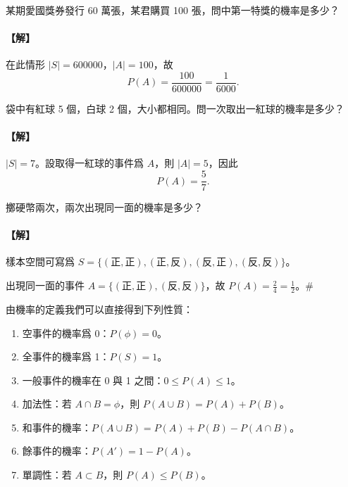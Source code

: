 \medskip
\begin{example}\label{ex:b5s-3-2}
某期愛國獎券發行 60 萬張，某君購買 100 張，問中第一特獎的機率是多少？
\end{example}
\paragraph{【解】}
在此情形 $|S|=600000$，$|A|=100$，故
\[
P(A) = \frac{100}{600000} = \frac{1}{6000}.
\]

\medskip
\begin{example}\label{ex:b5s-3-3}
袋中有紅球 5 個，白球 2 個，大小都相同。問一次取出一紅球的機率是多少？
\end{example}
\paragraph{【解】}
$|S|=7$。設取得一紅球的事件爲 $A$，則 $|A|=5$，因此
\[
P(A) = \frac{5}{7}. \tag*{\#}
\]

\medskip
\begin{example}\label{ex:b5s-3-4}
擲硬幣兩次，兩次出現同一面的機率是多少？
\end{example}
\paragraph{【解】}
樣本空間可寫爲 $S=\{(\text{正}, \text{正}), (\text{正}, \text{反}), (\text{反}, \text{正}), (\text{反}, \text{反})\}$。

出現同一面的事件 $A=\{(\text{正}, \text{正}), (\text{反}, \text{反})\}$，故 $P(A) = \frac{2}{4} = \frac{1}{2}$。\hfill $\#$

\medskip
由機率的定義我們可以直接得到下列性質：
\begin{enumerate}[label=\Roman*., itemsep=2pt, topsep=2pt]
  \item 空事件的機率爲 0：$P(\phi) = 0$。
  \item 全事件的機率爲 1：$P(S)=1$。
  \item 一般事件的機率在 0 與 1 之間：$0 \le P(A) \le 1$。
  \item 加法性：若 $A \cap B = \phi$，則 $P(A \cup B) = P(A) + P(B)$。
  \item 和事件的機率：$P(A \cup B) = P(A) + P(B) - P(A \cap B)$。
  \item 餘事件的機率：$P(A') = 1 - P(A)$。
  \item 單調性：若 $A \subset B$，則 $P(A) \le P(B)$。
\end{enumerate}

